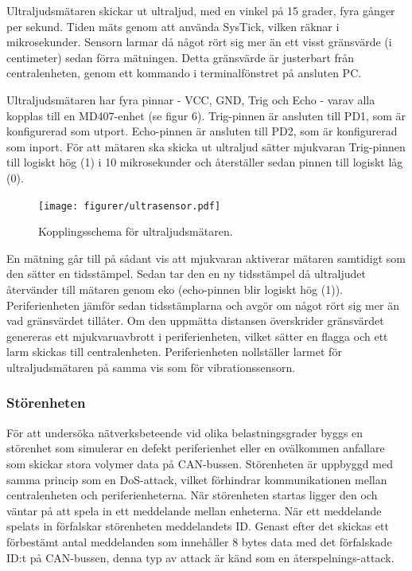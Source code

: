 Ultraljudsmätaren skickar ut ultraljud, med en vinkel på 15 grader, fyra gånger per sekund. Tiden mäts genom att använda SysTick, vilken räknar i mikrosekunder.
Sensorn larmar då något rört sig mer än ett visst gränsvärde (i centimeter) sedan förra mätningen. Detta gränsvärde är justerbart från centralenheten, genom ett kommando i terminalfönstret på ansluten PC.

Ultraljudsmätaren har fyra pinnar - VCC, GND, Trig och Echo - varav alla kopplas till en MD407-enhet (se figur 6).
Trig-pinnen är ansluten till PD1, som är konfigurerad som utport.
Echo-pinnen är ansluten till PD2, som är konfigurerad som inport.
För att mätaren ska skicka ut ultraljud sätter mjukvaran Trig-pinnen till logiskt hög (1) i 10 mikrosekunder och återställer sedan pinnen till logiskt låg (0).

\begin{figure}[h!]
	\centering\texttt{[image: figurer/ultrasensor.pdf]}
	\caption{Kopplingsschema för ultraljudsmätaren.}
	\label{figur:ultrasensor}
\end{figure}

En mätning går till på sådant vis att mjukvaran aktiverar mätaren samtidigt som den sätter en tidsstämpel. Sedan tar den en ny tidsstämpel då ultraljudet återvänder till mätaren genom eko (echo-pinnen blir logiskt hög (1)).
Periferienheten jämför sedan tidsstämplarna och avgör om något rört sig mer än vad gränsvärdet tillåter.
Om den uppmätta distansen överskrider gränsvärdet genereras ett mjukvaruavbrott i periferienheten, vilket sätter en flagga och ett larm skickas till centralenheten. Periferienheten nollställer larmet för ultraljudsmätaren på samma vis som för vibrationssensorn.

\subsubsection{Störenheten}

För att undersöka nätverksbeteende vid olika belastningsgrader byggs en störenhet som simulerar en defekt periferienhet eller en ovälkommen anfallare som skickar stora volymer data på CAN-bussen. Störenheten är uppbyggd med samma princip som en DoS-attack, vilket förhindrar kommunikationen mellan centralenheten och periferienheterna. När störenheten startas ligger den och väntar på att spela in ett meddelande mellan enheterna. När ett meddelande spelats in förfalskar störenheten meddelandets ID. Genast efter det skickas ett förbestämt antal meddelanden som innehåller 8 bytes data med det förfalskade ID:t på CAN-bussen, denna typ av attack är känd som en återspelnings-attack. 

